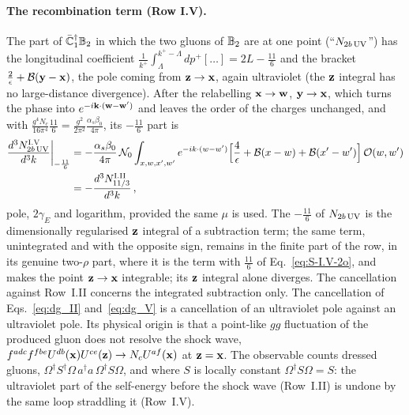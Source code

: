 \paragraph{The recombination term (Row I.V).} The part of $\bar{\mathbb{C}}_1^\dagger\mathbb{B}_2$ in which the two gluons of $\mathbb{B}_2$ are at one point (``$N_{2b\,\rm UV}$'') has the longitudinal coefficient $\frac{1}{k^+}\int_\Lambda^{k^+-\Lambda}dp^+[\dots]=2L-\frac{11}{6}$ and the bracket $\frac2\epsilon+\mathcal B(\mathbf{y}-\mathbf{x})$, the pole coming from $\mathbf{z}\to\mathbf{x}$, again ultraviolet (the $\mathbf{z}$ integral has no large-distance divergence). After the relabelling $\mathbf{x}\to\mathbf{w}$, $\mathbf{y}\to\mathbf{x}$, which turns the phase into $e^{-i\mathbf{k}\cdot(\mathbf{w}-\mathbf{w}')}$ and leaves the order of the charges unchanged, and with $\frac{g^4N_c}{16\pi^4}\frac{11}{6}=\frac{g^2}{2\pi^2}\frac{\alpha_s\beta_0}{4\pi}$, its $-\frac{11}{6}$ part is
\begin{align}\label{eq:dg_V}
\frac{d^3N^{\rm I.V}_{2b\,\rm UV}}{d^3k}\bigg|_{-\frac{11}{6}}&=-\frac{\alpha_s\beta_0}{4\pi}\,\mathcal N_0\int_{x,w,x',w'}e^{-ik\cdot(w-w')}\Big[\frac{4}{\epsilon}+\mathcal B(x-w)+\mathcal B(x'-w')\Big]\,\mathcal O(w,w')\notag\\&=-\frac{d^3N^{\rm I.II}_{11/3}}{d^3k}\,,
\end{align}
pole, $2\gamma_E$ and logarithm, provided the same $\mu$ is used. The $-\frac{11}{6}$ of $N_{2b\,\rm UV}$ is the dimensionally regularised $\mathbf{z}$ integral of a subtraction term; the same term, unintegrated and with the opposite sign, remains in the finite part of the row, in its genuine two-$\rho$ part, where it is the term with $\frac{11}{6}$ of Eq.~\eqref{eq:S-I.V-2o}, and makes the point $\mathbf{z}\to\mathbf{x}$ integrable; its $\mathbf{z}$ integral alone diverges. The cancellation against Row~I.II concerns the integrated subtraction only. The cancellation of Eqs.~\eqref{eq:dg_II} and~\eqref{eq:dg_V} is a cancellation of an ultraviolet pole against an ultraviolet pole. Its physical origin is that a point-like $gg$ fluctuation of the produced gluon does not resolve the shock wave, $f^{adc}f^{fbe}U^{db}(\mathbf{x})U^{ce}(\mathbf{z})\to N_cU^{af}(\mathbf{x})$ at $\mathbf{z}=\mathbf{x}$. The observable counts dressed gluons, $\Omega^\dagger S^\dagger\Omega\,a^\dagger a\,\Omega^\dagger S\Omega$, and where $S$ is locally constant $\Omega^\dagger S\Omega=S$: the ultraviolet part of the self-energy before the shock wave (Row~I.II) is undone by the same loop straddling it (Row~I.V). 

